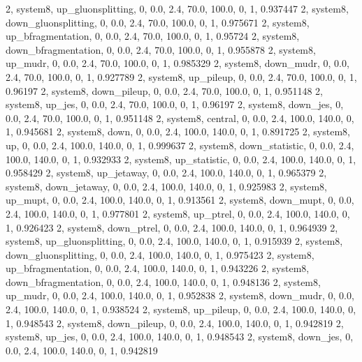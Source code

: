2, system8, up_gluonsplitting, 0, 0.0, 2.4, 70.0, 100.0, 0, 1, 0.937447
2, system8, down_gluonsplitting, 0, 0.0, 2.4, 70.0, 100.0, 0, 1, 0.975671
2, system8, up_bfragmentation, 0, 0.0, 2.4, 70.0, 100.0, 0, 1, 0.95724
2, system8, down_bfragmentation, 0, 0.0, 2.4, 70.0, 100.0, 0, 1, 0.955878
2, system8, up_mudr,         0, 0.0, 2.4, 70.0, 100.0, 0, 1, 0.985329
2, system8, down_mudr,       0, 0.0, 2.4, 70.0, 100.0, 0, 1, 0.927789
2, system8, up_pileup,       0, 0.0, 2.4, 70.0, 100.0, 0, 1, 0.96197
2, system8, down_pileup,     0, 0.0, 2.4, 70.0, 100.0, 0, 1, 0.951148
2, system8, up_jes,          0, 0.0, 2.4, 70.0, 100.0, 0, 1, 0.96197
2, system8, down_jes,        0, 0.0, 2.4, 70.0, 100.0, 0, 1, 0.951148
2, system8, central,    0, 0.0, 2.4, 100.0, 140.0, 0, 1, 0.945681
2, system8, down,       0, 0.0, 2.4, 100.0, 140.0, 0, 1, 0.891725
2, system8, up,         0, 0.0, 2.4, 100.0, 140.0, 0, 1, 0.999637
2, system8, down_statistic,       0, 0.0, 2.4, 100.0, 140.0, 0, 1, 0.932933
2, system8, up_statistic,         0, 0.0, 2.4, 100.0, 140.0, 0, 1, 0.958429
2, system8, up_jetaway,      0, 0.0, 2.4, 100.0, 140.0, 0, 1, 0.965379
2, system8, down_jetaway,    0, 0.0, 2.4, 100.0, 140.0, 0, 1, 0.925983
2, system8, up_mupt,         0, 0.0, 2.4, 100.0, 140.0, 0, 1, 0.913561
2, system8, down_mupt,       0, 0.0, 2.4, 100.0, 140.0, 0, 1, 0.977801
2, system8, up_ptrel,        0, 0.0, 2.4, 100.0, 140.0, 0, 1, 0.926423
2, system8, down_ptrel,      0, 0.0, 2.4, 100.0, 140.0, 0, 1, 0.964939
2, system8, up_gluonsplitting, 0, 0.0, 2.4, 100.0, 140.0, 0, 1, 0.915939
2, system8, down_gluonsplitting, 0, 0.0, 2.4, 100.0, 140.0, 0, 1, 0.975423
2, system8, up_bfragmentation, 0, 0.0, 2.4, 100.0, 140.0, 0, 1, 0.943226
2, system8, down_bfragmentation, 0, 0.0, 2.4, 100.0, 140.0, 0, 1, 0.948136
2, system8, up_mudr,         0, 0.0, 2.4, 100.0, 140.0, 0, 1, 0.952838
2, system8, down_mudr,       0, 0.0, 2.4, 100.0, 140.0, 0, 1, 0.938524
2, system8, up_pileup,       0, 0.0, 2.4, 100.0, 140.0, 0, 1, 0.948543
2, system8, down_pileup,     0, 0.0, 2.4, 100.0, 140.0, 0, 1, 0.942819
2, system8, up_jes,          0, 0.0, 2.4, 100.0, 140.0, 0, 1, 0.948543
2, system8, down_jes,        0, 0.0, 2.4, 100.0, 140.0, 0, 1, 0.942819
